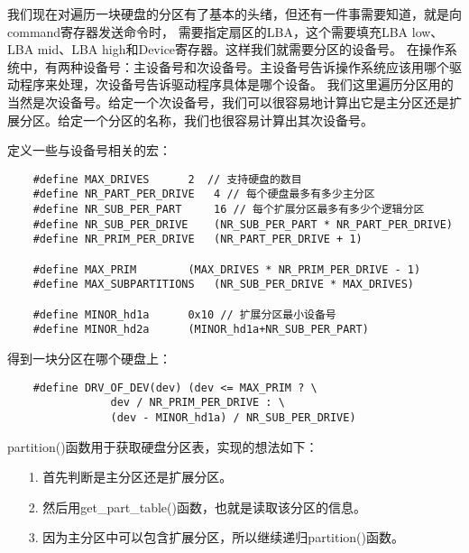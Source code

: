 \documentclass[a4paper,left=2.5cm,right=2.5cm,11pt]{article}
\begin{document}
	我们现在对遍历一块硬盘的分区有了基本的头绪，但还有一件事需要知道，就是向command寄存器发送命令时，
	需要指定扇区的LBA，这个需要填充LBA low、LBA mid、LBA high和Device寄存器。这样我们就需要分区的设备号。
	在操作系统中，有两种设备号：主设备号和次设备号。主设备号告诉操作系统应该用哪个驱动程序来处理，次设备号告诉驱动程序具体是哪个设备。
	我们这里遍历分区用的当然是次设备号。给定一个次设备号，我们可以很容易地计算出它是主分区还是扩展分区。给定一个分区的名称，我们也很容易计算出其次设备号。\par

	定义一些与设备号相关的宏：
	\begin{lstlisting}
	#define	MAX_DRIVES		2  // 支持硬盘的数目
	#define	NR_PART_PER_DRIVE	4 // 每个硬盘最多有多少主分区
	#define	NR_SUB_PER_PART		16 // 每个扩展分区最多有多少个逻辑分区
	#define	NR_SUB_PER_DRIVE	(NR_SUB_PER_PART * NR_PART_PER_DRIVE)
	#define	NR_PRIM_PER_DRIVE	(NR_PART_PER_DRIVE + 1)

	#define	MAX_PRIM		(MAX_DRIVES * NR_PRIM_PER_DRIVE - 1)
	#define	MAX_SUBPARTITIONS	(NR_SUB_PER_DRIVE * MAX_DRIVES)

	#define	MINOR_hd1a		0x10 // 扩展分区最小设备号
	#define	MINOR_hd2a		(MINOR_hd1a+NR_SUB_PER_PART)
	\end{lstlisting}

	得到一块分区在哪个硬盘上：
	\begin{lstlisting}
	#define	DRV_OF_DEV(dev) (dev <= MAX_PRIM ? \
				dev / NR_PRIM_PER_DRIVE : \
				(dev - MINOR_hd1a) / NR_SUB_PER_DRIVE)
	\end{lstlisting}

	partition()函数用于获取硬盘分区表，实现的想法如下：
	\begin{itemize}
		\item[1.] 首先判断是主分区还是扩展分区。
		\item[2.] 然后用get\_part\_table()函数，也就是读取该分区的信息。
		\item[3.] 因为主分区中可以包含扩展分区，所以继续递归partition()函数。
	\end{itemize}
\end{document}
